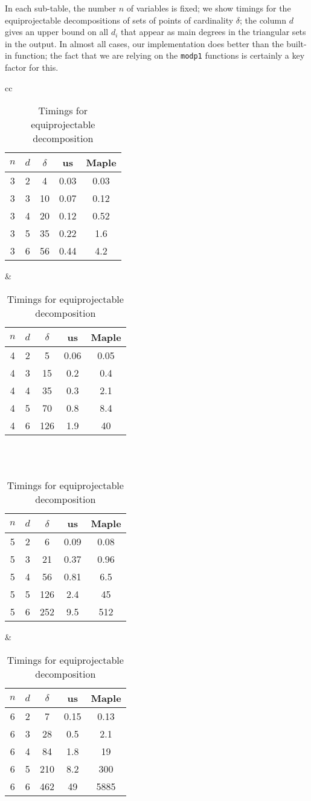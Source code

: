 \documentclass[12pt]{article}
\begin{document}
In each sub-table, the number $n$ of variables is fixed; we show
timings for the equiprojectable decompositions of sets of points of
cardinality $\delta$; the column $d$ gives an upper bound on all $d_i$
that appear as main degrees in the triangular sets in the output.  In
almost all cases, our implementation does better than the built-in
function; the fact that we are relying on the {\tt modp1} functions is
certainly a key factor for this.

\begin{table}
  \caption{Timings for equiprojectable decomposition}\label{table1}
  \begin{center}
  \begin{tabular}{cc}
  \begin{tabular}{c|c|c||c|c}
    $n$ & $d$ & $\delta$ & us & Maple \\ \hline
    3& 2& 4&  0.03 & 0.03 \\
    3& 3& 10& {0.07}& 0.12\\
    3& 4& 20& {0.12} & 0.52 \\
    3& 5& 35& {0.22} &1.6 \\
    3& 6& 56& {0.44} & 4.2
  \end{tabular}
&
  \begin{tabular}{c|c|c||c|c}
    $n$ & $d$ & $\delta$ & us & Maple \\ \hline
4& 2& 5 & 0.06 & {0.05} \\
4& 3& 15 & {0.2} & 0.4\\
4& 4& 35 & {0.3} & 2.1\\
4& 5& 70 & {0.8} & 8.4\\
4& 6& 126 & {1.9} & 40
  \end{tabular} 
\\
\\
  \begin{tabular}{c|c|c||c|c}
    $n$ & $d$ & $\delta$ & us & Maple \\ \hline
5& 2& 6 & 0.09 & {0.08}\\
5& 3& 21 & {0.37} & 0.96\\
5& 4& 56 & {0.81} & 6.5\\
5& 5& 126& {2.4} & 45 \\
5& 6& 252& {9.5} & 512
  \end{tabular}
&
  \begin{tabular}{c|c|c||c|c}
    $n$ & $d$ & $\delta$ & us & Maple \\ \hline
6& 2& 7 & 0.15 & {0.13} \\
6& 3& 28& {0.5} & 2.1\\
6& 4& 84& {1.8} &19\\
6& 5& 210& {8.2} & 300\\
6& 6& 462& {49} & 5885
  \end{tabular} 
  \end{tabular}
  \end{center}
\end{table}
\end{document}
